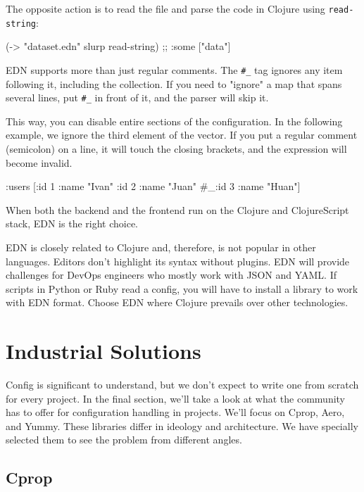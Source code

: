 The opposite action is to read the file and parse the code in Clojure using \verb|read-string|:

\begin{clojure}
(-> "dataset.edn" slurp read-string)
;; {:some ["data"]}
\end{clojure}


EDN supports more than just regular comments. The \verb|#_| tag ignores any item following it, including the collection. If you need to "ignore" a map that spans several lines, put \verb|#_| in front of it, and the parser will skip it.


This way, you can disable entire sections of the configuration. In the following example, we ignore the third element of the vector. If you put a regular comment (semicolon) on a line, it will touch the closing brackets, and the expression will become invalid.

\begin{clojure}
{:users [{:id 1 :name "Ivan"}
         {:id 2 :name "Juan"}
         #_{:id 3 :name "Huan"}]}
\end{clojure}

When both the backend and the frontend run on the Clojure and ClojureScript stack, EDN is the right choice.

EDN is closely related to Clojure and, therefore, is not popular in other languages. Editors don't highlight its syntax without plugins. EDN will provide challenges for DevOps engineers who mostly work with JSON and YAML. If scripts in Python or Ruby read a config, you will have to install a library to work with EDN format. Choose EDN where Clojure prevails over other technologies.

\section{Industrial Solutions}

Config is significant to understand, but we don't expect to write one from scratch for every project. In the final section, we'll take a look at what the community has to offer for configuration handling in projects. We'll focus on Cprop, Aero, and Yummy. These libraries differ in ideology and architecture. We have specially selected them to see the problem from different angles.

\subsection{Cprop}

